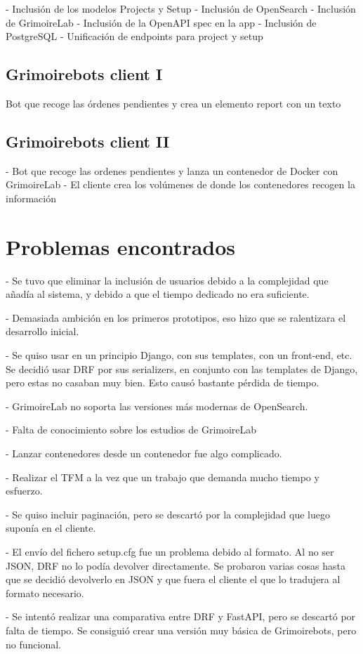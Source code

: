 - Inclusión de los modelos Projects y Setup
- Inclusión de OpenSearch
- Inclusión de GrimoireLab
- Inclusión de la OpenAPI spec en la app
- Inclusión de PostgreSQL
- Unificación de endpoints para project y setup

\subsection{Grimoirebots client I}

Bot que recoge las órdenes pendientes y crea un elemento report con un texto

\subsection{Grimoirebots client II}

- Bot que recoge las ordenes pendientes y lanza un contenedor de Docker con GrimoireLab
- El cliente crea los volúmenes de donde los contenedores recogen la información


\section{Problemas encontrados}

- Se tuvo que eliminar la inclusión de usuarios debido a la complejidad que añadía al sistema, y debido a que el tiempo dedicado no era suficiente.

- Demasiada ambición en los primeros prototipos, eso hizo que se ralentizara el desarrollo inicial.

- Se quiso usar en un principio Django, con sus templates, con un front-end, etc. Se decidió usar DRF por sus serializers, en conjunto con las templates de Django, pero estas no casaban muy bien. Esto causó bastante pérdida de tiempo.

- GrimoireLab no soporta las versiones más modernas de OpenSearch.

- Falta de conocimiento sobre los estudios de GrimoireLab

- Lanzar contenedores desde un contenedor fue algo complicado.

- Realizar el TFM a la vez que un trabajo que demanda mucho tiempo y esfuerzo.

- Se quiso incluir paginación, pero se descartó por la complejidad que luego suponía en el cliente.

- El envío del fichero setup.cfg fue un problema debido al formato. Al no ser JSON, DRF no lo podía devolver directamente. Se probaron varias cosas hasta que se decidió devolverlo en JSON y que fuera el cliente el que lo tradujera al formato necesario.

- Se intentó realizar una comparativa entre DRF y FastAPI, pero se descartó por falta de tiempo. Se consiguió crear una versión muy básica de Grimoirebots, pero no funcional.
